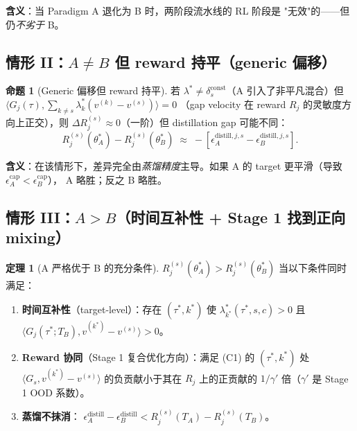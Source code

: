 \documentclass[11pt,a4paper]{article}
\newcommand{\const}{\mathrm{const}}
\theoremstyle{definition}
\newtheorem{proposition}{命题}
\newtheorem{theorem}{定理}
\begin{document}
\textbf{含义}：当 Paradigm A 退化为 B 时，两阶段流水线的 RL 阶段是
"无效"的——但仍\emph{不劣于} B。

\subsection{情形 II：$A \neq B$ 但 reward 持平（generic 偏移）}

\begin{proposition}[Generic 偏移但 reward 持平]
\label{prop:generic_neutral}
若 $\lambda^* \neq \delta_s^{\const}$（A 引入了非平凡混合）但
$\langle G_j(\tau), \sum_{k \neq s} \lambda_k^*(v^{(k)} - v^{(s)})\rangle = 0$
（gap velocity 在 reward $R_j$ 的灵敏度方向上正交），则
$\Delta R_j^{(s)} \approx 0$（一阶）但 distillation gap 可能不同：
\begin{equation}
R_j^{(s)}(\theta_A^*) - R_j^{(s)}(\theta_B^*) \;\approx\; -[\epsilon_A^{\text{distill}, j, s} - \epsilon_B^{\text{distill}, j, s}].
\end{equation}
\end{proposition}

\textbf{含义}：在该情形下，差异完全由\emph{蒸馏精度}主导。如果 A 的
target 更平滑（导致 $\epsilon_A^{\text{cap}} < \epsilon_B^{\text{cap}}$），
A 略胜；反之 B 略胜。

\subsection{情形 III：$A > B$（时间互补性 + Stage 1 找到正向 mixing）}

\begin{theorem}[A 严格优于 B 的充分条件]
\label{thm:A_strict_better}
$R_j^{(s)}(\theta_A^*) > R_j^{(s)}(\theta_B^*)$ 当以下条件同时满足：
\begin{enumerate}[leftmargin=1.5em]
\item[(C1)] \textbf{时间互补性}（target-level）：存在 $(\tau^*, k^*)$ 使
$\lambda_{k^*}^*(\tau^*, s, c) > 0$ 且
$\langle G_j(\tau^*; T_B), v^{(k^*)} - v^{(s)}\rangle > 0$。
\item[(C2)] \textbf{Reward 协同}（Stage 1 复合优化方向）：满足 (C1) 的 $(\tau^*, k^*)$ 处 $\langle G_s, v^{(k^*)} - v^{(s)}\rangle$ 的负贡献小于其在 $R_j$ 上的正贡献的 $1/\gamma'$ 倍（$\gamma'$ 是 Stage 1 OOD 系数）。
\item[(C3)] \textbf{蒸馏不抹消}：
$\epsilon_A^{\text{distill}} - \epsilon_B^{\text{distill}} < R_j^{(s)}(T_A) - R_j^{(s)}(T_B)$。
\end{enumerate}
\end{theorem}
\end{document}
